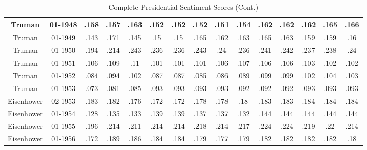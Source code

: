 \begin{sidewaystable}
\begin{singlespace}
\begin{center}
\begin{tabular}{||c c c c c c c c c c c c c c c||}
\hline
Truman & 01-1948 & .158 & .157 & .163 & .152 & .152 & .152 & .151 & .154 & .162 & .162 & .162 & .165 & .166 \\ 
\hline
Truman & 01-1949 & .143 & .171 & .145 & .15 & .15 & .165 & .162 & .163 & .165 & .163 & .159 & .159 & .16 \\ 
\hline
Truman & 01-1950 & .194 & .214 & .243 & .236 & .236 & .243 & .24 & .236 & .241 & .242 & .237 & .238 & .24 \\ 
\hline
Truman & 01-1951 & .106 & .109 & .11 & .101 & .101 & .101 & .106 & .107 & .106 & .106 & .103 & .102 & .102 \\ 
\hline
Truman & 01-1952 & .084 & .094 & .102 & .087 & .087 & .085 & .086 & .089 & .099 & .099 & .102 & .104 & .103 \\ 
\hline
Truman & 01-1953 & .073 & .081 & .085 & .093 & .093 & .093 & .093 & .092 & .092 & .092 & .093 & .093 & .093 \\ 
\hline
Eisenhower & 02-1953 & .183 & .182 & .176 & .172 & .172 & .178 & .178 & .18 & .183 & .183 & .184 & .184 & .184 \\ 
\hline
Eisenhower & 01-1954 & .128 & .135 & .133 & .139 & .139 & .137 & .137 & .132 & .144 & .144 & .144 & .144 & .144 \\ 
\hline
Eisenhower & 01-1955 & .196 & .214 & .211 & .214 & .214 & .218 & .214 & .217 & .224 & .224 & .219 & .22 & .214 \\ 
\hline
Eisenhower & 01-1956 & .172 & .189 & .186 & .184 & .184 & .179 & .177 & .179 & .182 & .182 & .182 & .182 & .18 \\ 
\hline
 \hline
 \end{tabular}
\end{center}
\caption{Complete Presidential Sentiment Scores (Cont.)}
\label{appendix:sent7}
\end{singlespace}
\end{sidewaystable}

